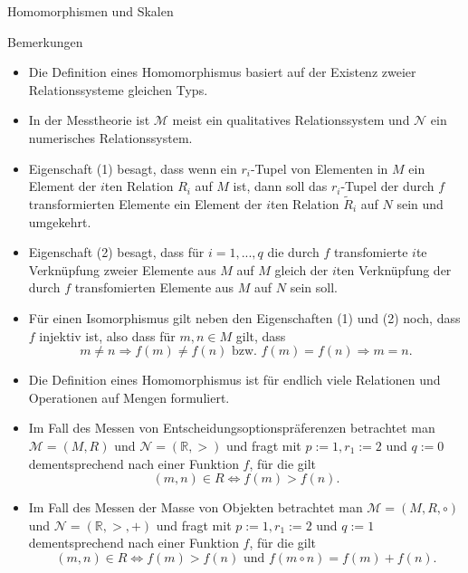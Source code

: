 \documentclass[
  8pt,
  ignorenonframetext,
]{beamer}
\providecommand{\tightlist}{%
  \setlength{\itemsep}{0pt}\setlength{\parskip}{0pt}}
\begin{document}
\begin{frame}{Homomorphismen und Skalen}
\protect\hypertarget{homomorphismen-und-skalen-1}{}
\footnotesize
\vspace{1mm}

Bemerkungen \vspace{-1mm}

\begin{itemize}
\tightlist
\item
  \justifying Die Definition eines Homomorphismus basiert auf der
  Existenz zweier Relationssysteme gleichen Typs.
\item
  In der Messtheorie ist \(\mathcal{M}\) meist ein qualitatives
  Relationssystem und \(\mathcal{N}\) ein numerisches Relationssystem.
\item
  Eigenschaft (1) besagt, dass wenn ein \(r_i\)-Tupel von Elementen in
  \(M\) ein Element der \(i\)ten Relation \(R_i\) auf \(M\) ist, dann
  soll das \(r_i\)-Tupel der durch \(f\) transformierten Elemente ein
  Element der \(i\)ten Relation \(\tilde{R}_i\) auf \(N\) sein und
  umgekehrt.
\item
  Eigenschaft (2) besagt, dass für \(i = 1,...,q\) die durch \(f\)
  transfomierte \(i\)te Verknüpfung zweier Elemente aus \(M\) auf \(M\)
  gleich der \(i\)ten Verknüpfung der durch \(f\) transfomierten
  Elemente aus \(M\) auf \(N\) sein soll.
\item
  Für einen Isomorphismus gilt neben den Eigenschaften (1) und (2) noch,
  dass \(f\) injektiv ist, also dass für \(m,n\in M\) gilt, dass
  \begin{equation}
  m \neq n \Rightarrow f(m) \neq f(n) \mbox{ bzw. } f(m) = f(n) \Rightarrow m = n.
  \end{equation}
\item
  Die Definition eines Homomorphismus ist für endlich viele Relationen
  und Operationen auf Mengen formuliert.
\item
  Im Fall des Messen von Entscheidungsoptionspräferenzen betrachtet man
  \(\mathcal{M} = (M,R)\) und \(\mathcal{N} = (\mathbb{R},>)\) und fragt
  mit \(p := 1, r_1 := 2\) und \(q:=0\) dementsprechend nach einer
  Funktion \(f\), für die gilt \begin{equation}
  (m,n) \in R \Leftrightarrow f(m) > f(n).
  \end{equation}
\item
  Im Fall des Messen der Masse von Objekten betrachtet man
  \(\mathcal{M} = (M,R,\circ)\) und \(\mathcal{N} = (\mathbb{R},>,+)\)
  und fragt mit \(p := 1,r_1 := 2\) und \(q:=1\) dementsprechend nach
  einer Funktion \(f\), für die gilt \begin{equation}
  (m,n) \in R \Leftrightarrow f(m) > f(n)
  \mbox{ und }
  f(m \circ n) = f(m) + f(n).
  \end{equation}
\end{itemize}
\end{frame}
\end{document}

